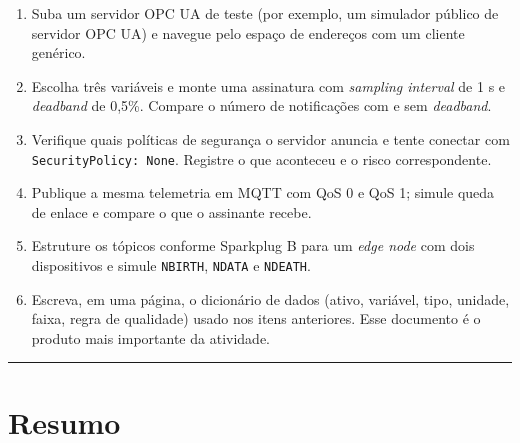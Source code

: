 \begin{enumerate}
\def\labelenumi{\arabic{enumi}.}
\tightlist
\item
  Suba um servidor OPC UA de teste (por exemplo, um simulador público de servidor OPC UA) e navegue pelo espaço de endereços com um cliente genérico.
\item
  Escolha três variáveis e monte uma assinatura com \emph{sampling interval} de 1 s e \emph{deadband} de 0,5\%. Compare o número de notificações com e sem \emph{deadband}.
\item
  Verifique quais políticas de segurança o servidor anuncia e tente conectar com \passthrough{\lstinline!SecurityPolicy: None!}. Registre o que aconteceu e o risco correspondente.
\item
  Publique a mesma telemetria em MQTT com QoS 0 e QoS 1; simule queda de enlace e compare o que o assinante recebe.
\item
  Estruture os tópicos conforme Sparkplug B para um \emph{edge node} com dois dispositivos e simule \passthrough{\lstinline!NBIRTH!}, \passthrough{\lstinline!NDATA!} e \passthrough{\lstinline!NDEATH!}.
\item
  Escreva, em uma página, o dicionário de dados (ativo, variável, tipo, unidade, faixa, regra de qualidade) usado nos itens anteriores. Esse documento é o produto mais importante da atividade.
\end{enumerate}

\begin{center}\rule{0.5\linewidth}{0.5pt}\end{center}

\section{Resumo}\label{resumo}

